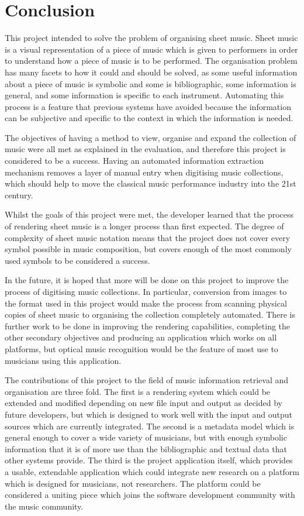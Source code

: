 \section{Conclusion}
This project intended to solve the problem of organising sheet music. Sheet music is a visual representation of a piece of music which is given to performers in order to understand how a piece of music is to be performed. The organisation problem has many facets to how it could and should be solved, as some useful information about a piece of music is symbolic and some is bibliographic, some information is general, and some information is specific to each instrument. Automating this process is a feature that previous systems have avoided because the information can be subjective and specific to the context in which the information is needed.

The objectives of having a method to view, organise and expand the collection of music were all met as explained in the evaluation, and therefore this project is considered to be a success. Having an automated information extraction mechanism removes a layer of manual entry when digitising music collections, which should help to move the classical music performance industry into the 21st century. 

Whilst the goals of this project were met, the developer learned that the process of rendering sheet music is a longer process than first expected. The degree of complexity of sheet music notation means that the project does not cover every symbol possible in music composition, but covers enough of the most commonly used symbols to be considered a success.

In the future, it is hoped that more will be done on this project to improve the process of digitising music collections. In particular, conversion from images to the format used in this project would make the process from scanning physical copies of sheet music to organising the collection completely automated. There is further work to be done in improving the rendering capabilities, completing the other secondary objectives and producing an application which works on all platforms, but optical music recognition would be the feature of most use to musicians using this application.


The contributions of this project to the field of music information retrieval and organisation are three fold. The first is a rendering system which could be extended and modified depending on new file input and output as decided by future developers, but which is designed to work well with the input and output sources which are currently integrated. The second is a metadata model which is general enough to cover a wide variety of musicians, but with enough symbolic information that it is of more use than the bibliographic and textual data that other systems provide. The third is the project application itself, which provides a usable, extendable application which could integrate new research on a platform which is designed for musicians, not researchers. The platform could be considered a uniting piece which joins the software development community with the music community.
